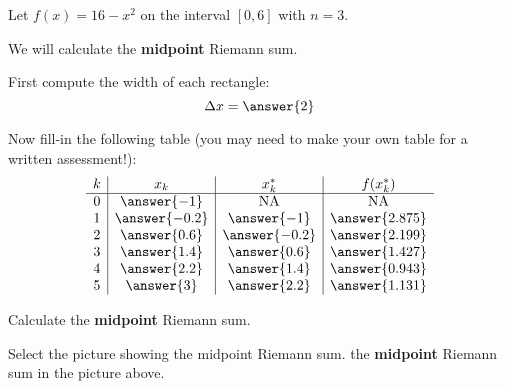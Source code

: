 \documentclass{ximera}
\begin{document}
\begin{exercise}
Let $f(x)= 16 - x^{2}$ on the interval $[0,6]$ with $n=3$.
\begin{image}
\end{image}
We will calculate the \textbf{midpoint} Riemann sum.
\begin{exercise}  
  First compute the width of each rectangle:
  \[
  \Delta x = \answer{2}
  \]
  \begin{exercise}
    Now fill-in the following table (you may need to make your own table for a written assessment!):
    \[
    \begin{array}{c|c|c|c}
      k &  x_k & x^*_k & f(x^*_k) \\ \hline  %
      0 & \answer{-1}   & \text{NA} & \text{NA}  \\
      1 & \answer{-0.2} & \answer{-1}        &   \answer{2.875}     \\
      2 & \answer{0.6}  & \answer{-0.2}      & \answer{2.199}   \\
      3 & \answer{1.4}  & \answer{0.6}       & \answer{1.427}    \\
      4 & \answer{2.2}  & \answer{1.4}       & \answer{0.943}   \\
      5 & \answer{3}    & \answer{2.2}      & \answer{1.131}        \\
    \end{array}
\]
  \end{exercise}
\end{exercise}


  Calculate the \textbf{midpoint} Riemann sum.



  Select the picture showing the midpoint Riemann sum. the
  \textbf{midpoint} Riemann sum in the picture above.



\end{exercise}
\end{document}
